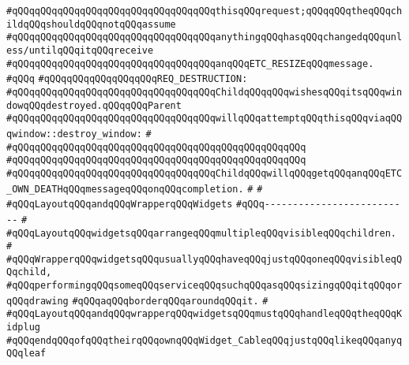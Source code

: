 \verb|#qQQqqQQqqQQqqQQqqQQqqQQqqQQqqQQqqQQqthisqQQqrequest;qQQqqQQqtheqQQqchildqQQqshouldqQQqnotqQQqassume|\newline
\verb|#qQQqqQQqqQQqqQQqqQQqqQQqqQQqqQQqqQQqanythingqQQqhasqQQqchangedqQQqunless/untilqQQqitqQQqreceive|\newline
\verb|#qQQqqQQqqQQqqQQqqQQqqQQqqQQqqQQqqQQqanqQQqETC_RESIZEqQQqmessage.|\newline
\verb|#qQQq|\newline
\verb|#qQQqqQQqqQQqqQQqqQQqREQ_DESTRUCTION:|\newline
\verb|#qQQqqQQqqQQqqQQqqQQqqQQqqQQqqQQqqQQqChildqQQqqQQqwishesqQQqitsqQQqwindowqQQqdestroyed.qQQqqQQqParent|\newline
\verb|#qQQqqQQqqQQqqQQqqQQqqQQqqQQqqQQqqQQqwillqQQqattemptqQQqthisqQQqviaqQQqwindow::destroy_window:|\newline
\verb|#|\newline
\verb|#qQQqqQQqqQQqqQQqqQQqqQQqqQQqqQQqqQQqqQQqqQQqqQQqqQQq|\newline
\verb|#qQQqqQQqqQQqqQQqqQQqqQQqqQQqqQQqqQQqqQQqqQQqqQQqqQQq|\newline
\verb|#qQQqqQQqqQQqqQQqqQQqqQQqqQQqqQQqqQQqChildqQQqwillqQQqgetqQQqanqQQqETC_OWN_DEATHqQQqmessageqQQqonqQQqcompletion.|\newline
\verb|#|\newline
\verb|#|\newline
\verb|#qQQqLayoutqQQqandqQQqWrapperqQQqWidgets|\newline
\verb|#qQQq--------------------------|\newline
\verb|#|\newline
\verb|#qQQqLayoutqQQqwidgetsqQQqarrangeqQQqmultipleqQQqvisibleqQQqchildren.|\newline
\verb|#|\newline
\verb|#qQQqWrapperqQQqwidgetsqQQqusuallyqQQqhaveqQQqjustqQQqoneqQQqvisibleqQQqchild,|\newline
\verb|#qQQqperformingqQQqsomeqQQqserviceqQQqsuchqQQqasqQQqsizingqQQqitqQQqorqQQqdrawing|\newline
\verb|#qQQqaqQQqborderqQQqaroundqQQqit.|\newline
\verb|#|\newline
\verb|#qQQqLayoutqQQqandqQQqwrapperqQQqwidgetsqQQqmustqQQqhandleqQQqtheqQQqKidplug|\newline
\verb|#qQQqendqQQqofqQQqtheirqQQqownqQQqWidget_CableqQQqjustqQQqlikeqQQqanyqQQqleaf|\newline
